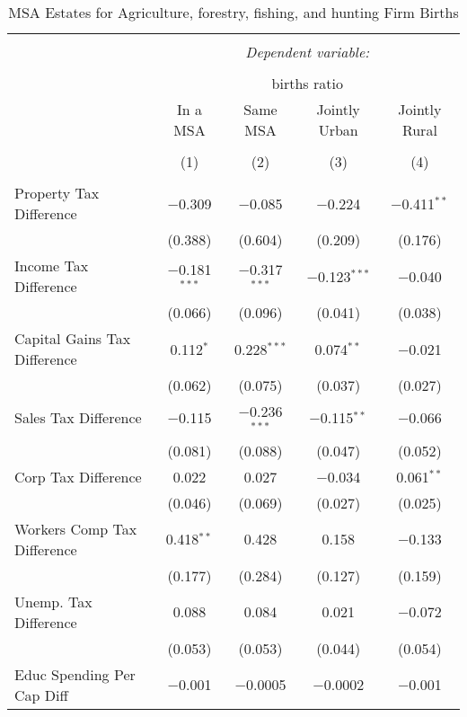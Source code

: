 
\begin{table}[!htbp] \centering 
  \caption{MSA Estates for  Agriculture, forestry, fishing, and hunting Firm Births} 
  \label{11metro} 
\begin{tabular}{@{\extracolsep{5pt}}lcccc} 
\\[-1.8ex]\hline 
\hline \\[-1.8ex] 
 & \multicolumn{4}{c}{\textit{Dependent variable:}} \\ 
\cline{2-5} 
\\[-1.8ex] & \multicolumn{4}{c}{births ratio} \\ 
 & In a MSA & Same MSA & Jointly Urban & Jointly Rural \\ 
\\[-1.8ex] & (1) & (2) & (3) & (4)\\ 
\hline \\[-1.8ex] 
 Property Tax Difference & $-$0.309 & $-$0.085 & $-$0.224 & $-$0.411$^{**}$ \\ 
  & (0.388) & (0.604) & (0.209) & (0.176) \\ 
  Income Tax Difference & $-$0.181$^{***}$ & $-$0.317$^{***}$ & $-$0.123$^{***}$ & $-$0.040 \\ 
  & (0.066) & (0.096) & (0.041) & (0.038) \\ 
  Capital Gains Tax Difference & 0.112$^{*}$ & 0.228$^{***}$ & 0.074$^{**}$ & $-$0.021 \\ 
  & (0.062) & (0.075) & (0.037) & (0.027) \\ 
  Sales Tax Difference & $-$0.115 & $-$0.236$^{***}$ & $-$0.115$^{**}$ & $-$0.066 \\ 
  & (0.081) & (0.088) & (0.047) & (0.052) \\ 
  Corp Tax Difference & 0.022 & 0.027 & $-$0.034 & 0.061$^{**}$ \\ 
  & (0.046) & (0.069) & (0.027) & (0.025) \\ 
  Workers Comp Tax Difference & 0.418$^{**}$ & 0.428 & 0.158 & $-$0.133 \\ 
  & (0.177) & (0.284) & (0.127) & (0.159) \\ 
  Unemp. Tax Difference & 0.088 & 0.084 & 0.021 & $-$0.072 \\ 
  & (0.053) & (0.053) & (0.044) & (0.054) \\ 
  Educ Spending Per Cap Diff & $-$0.001 & $-$0.0005 & $-$0.0002 & $-$0.001 \\ 

\end{tabular}
\end{table}
